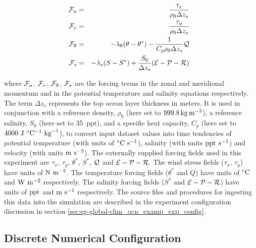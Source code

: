 \begin{eqnarray}
\label{eq:eg-global-global_forcing}
\label{eq:eg-global-global_forcing_fu}
{\cal F}_{u} & = & \frac{\tau_{x}}{\rho_{0} \Delta z_{s}}
\\
\label{eq:eg-global-global_forcing_fv}
{\cal F}_{v} & = & \frac{\tau_{y}}{\rho_{0} \Delta z_{s}}
\\
\label{eq:eg-global-global_forcing_ft}
{\cal F}_{\theta} & = & - \lambda_{\theta} ( \theta - \theta^{\ast} )
 - \frac{1}{C_{p} \rho_{0} \Delta z_{s}}{\cal Q}
\\
\label{eq:eg-global-global_forcing_fs}
{\cal F}_{s} & = & - \lambda_{s} ( S - S^{\ast} )
 + \frac{S_{0}}{\Delta z_{s}}({\cal E} - {\cal P} - {\cal R})
\end{eqnarray}

\noindent where ${\cal F}_{u}$, ${\cal F}_{v}$, ${\cal F}_{\theta}$,
${\cal F}_{s}$ are the forcing terms in the zonal and meridional
momentum and in the potential temperature and salinity
equations respectively.
The term $\Delta z_{s}$ represents the top ocean layer thickness in
meters.
It is used in conjunction with a reference density, $\rho_{0}$
(here set to $999.8\,{\rm kg\,m^{-3}}$), a
reference salinity, $S_{0}$ (here set to 35~ppt),
and a specific heat capacity, $C_{p}$ (here set to
$4000~{\rm J}~^{\circ}{\rm C}^{-1}~{\rm kg}^{-1}$), to convert
input dataset values into time tendencies of
potential temperature (with units of $^{\circ}{\rm C}~{\rm s}^{-1}$),
salinity (with units ${\rm ppt}~s^{-1}$) and
velocity (with units ${\rm m}~{\rm s}^{-2}$).
The externally supplied forcing fields used in this
experiment are $\tau_{x}$, $\tau_{y}$, $\theta^{\ast}$, $S^{\ast}$,
$\cal{Q}$ and $\cal{E}-\cal{P}-\cal{R}$. The wind stress fields ($\tau_x$, $\tau_y$)
have units of ${\rm N}~{\rm m}^{-2}$. The temperature forcing fields
($\theta^{\ast}$ and $Q$) have units of $^{\circ}{\rm C}$ and ${\rm W}~{\rm m}^{-2}$
respectively. The salinity forcing fields ($S^{\ast}$ and
$\cal{E}-\cal{P}-\cal{R}$) have units of ${\rm ppt}$ and ${\rm m}~{\rm s}^{-1}$
respectively. The source files and procedures for ingesting this data into the
simulation are described in the experiment configuration discussion in section
\ref{sec:eg-global-clim_ocn_examp_exp_config}.


\subsection{Discrete Numerical Configuration}


